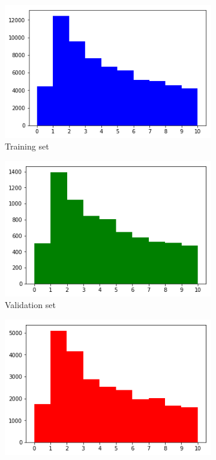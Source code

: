 \documentclass[12pt]{article}
\begin{document}
\begin{figure}[h]
	\centering
	\begin{subfigure}{0.31\textwidth}
		\includegraphics[width=\linewidth]{hist_train}
		\caption{Training set}
		\label{fig:hista}
	\end{subfigure}
	\hspace*{\fill} %
	\begin{subfigure}{0.31\textwidth}
		\includegraphics[width=\linewidth]{hist_validation}
		\caption{Validation set}
		\label{fig:histb}
	\end{subfigure}
	\hspace*{\fill} %
	\begin{subfigure}{0.31\textwidth}
		\includegraphics[width=\linewidth]{hist_test}

\end{subfigure}
\end{figure}
\end{document}
